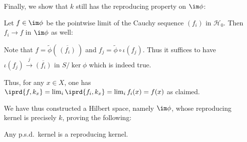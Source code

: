 \begin{mylist}
		\item Finally, we show that $k$ still has the reproducing property on $\im\phi$:
		\begin{subproof}
			Let $f\in\im\phi$ be the pointwise limit of the Cauchy sequence $(f_i)$ in $\mathscr H_0$. Then $f_i\to f$ in $\im\phi$ as well:
			\begin{subproof}
				Note that $f = \tilde\phi(\, \overline{(f_i)} \,)$ and $f_j = \tilde\phi\circ\iota(f_j)$. Thus it suffices to have $\iota(f_j)\stackrel{j}{\to} \overline{(f_i)}$ in $S/\ker\phi$ which is indeed true.
			\end{subproof}
			Thus, for any $x\in X$, one has $\iprd{f, k_x} = \lim_i \iprd{f_i, k_x} = \lim_i f_i(x) = f(x)$ as claimed.
		\end{subproof}
	\end{mylist}
	
	We have thus constructed a Hilbert space, namely $\im\phi$, whose reproducing kernel is precisely $k$, proving the following:
	
	\begin{thm}\label{THM: Moore-Aronszajn}
		Any p.s.d.\ kernel is a reproducing kernel.
	\end{thm}